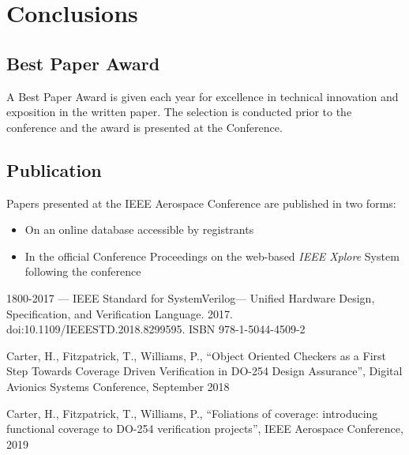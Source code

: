 \documentclass[twocolumn,letterpaper]{IEEEAerospaceCLS}  %
\begin{document}
\section{Conclusions}
\subsection{Best Paper Award}
A Best Paper Award is given each year for excellence in technical innovation and exposition in the written paper. The selection is conducted prior to the conference and the award is presented at the Conference.

\subsection{Publication}
Papers presented at the IEEE Aerospace Conference are published in two forms:
\begin{itemize}
  \item [1)] On an online database accessible by registrants \\
  \item [2)] In the official Conference Proceedings on the web-based {\it{IEEE Xplore}} System following the conference
\end{itemize}








%
\begin{thebibliography}{1}

1800-2017 — IEEE Standard for SystemVerilog—
Unified Hardware Design, Specification, and Verification
Language. 2017. doi:10.1109/IEEESTD.2018.8299595.
ISBN 978-1-5044-4509-2

Carter, H., Fitzpatrick, T., Williams, P., “Object Oriented
Checkers as a First Step Towards Coverage Driven
Verification in DO-254 Design Assurance”, Digital
Avionics Systems Conference, September 2018

Carter, H., Fitzpatrick, T., Williams, P., “Foliations of coverage: introducing functional coverage to DO-254 verification projects”, IEEE Aerospace Conference, 2019

\end{thebibliography}
\end{document}
